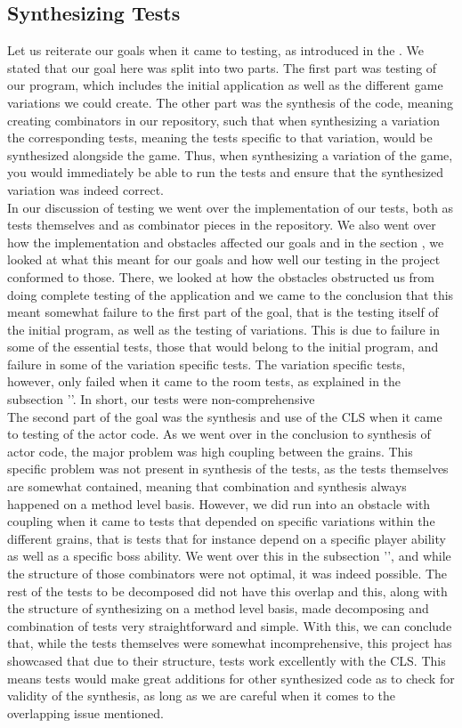 \subsection{Synthesizing Tests}
Let us reiterate our goals when it came to testing, as introduced in the . We stated that our goal here was split into two parts. The first part was testing of our program, which includes the initial application as well as the different game variations we could create. The other part was the synthesis of the code, meaning creating combinators in our repository, such that when synthesizing a variation the corresponding tests, meaning the tests specific to that variation, would be synthesized alongside the game. Thus, when synthesizing a variation of the game, you would immediately be able to run the tests and ensure that the synthesized variation was indeed correct. \\
In our discussion of testing we went over the implementation of our tests, both as tests themselves and as combinator pieces in the repository. We also went over how the implementation and obstacles affected our goals and in the section , we looked at what this meant for our goals and how well our testing in the project conformed to those. There, we looked at how the obstacles obstructed us from doing complete testing of the application and we came to the conclusion that this meant somewhat failure to the first part of the goal, that is the testing itself of the initial program, as well as the testing of variations. This is due to failure in some of the essential tests, those that would belong to the initial program, and failure in some of the variation specific tests. The variation specific tests, however, only failed when it came to the room tests, as explained in the subsection ''. In short, our tests were non-comprehensive \\
The second part of the goal was the synthesis and use of the CLS when it came to testing of the actor code. As we went over in the conclusion to synthesis of actor code, the major problem was high coupling between the grains. This specific problem was not present in synthesis of the tests, as the tests themselves are somewhat contained, meaning that combination and synthesis always happened on a method level basis. However, we did run into an obstacle with coupling when it came to tests that depended on specific variations within the different grains, that is tests that for instance depend on a specific player ability as well as a specific boss ability. We went over this in the subsection '', and while the structure of those combinators were not optimal, it was indeed possible. The rest of the tests to be decomposed did not have this overlap and this, along with the structure of synthesizing on a method level basis, made decomposing and combination of tests very straightforward and simple. With this, we can conclude that, while the tests themselves were somewhat incomprehensive, this project has showcased that due to their structure, tests work excellently with the CLS. This means tests would make great additions for other synthesized code as to check for validity of the synthesis, as long as we are careful when it comes to the overlapping issue mentioned.
